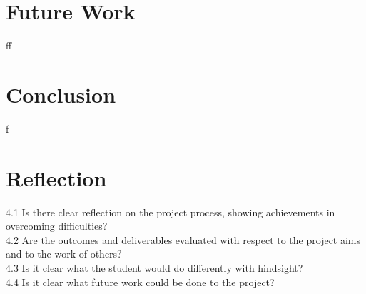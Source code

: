 \documentclass[12pt,a4paper]{article}
\begin{document}
\section{Future Work}
ff

\section{Conclusion}
f
\section{Reflection}
4.1 Is there clear reflection on the project process, showing achievements in overcoming difficulties?\\
4.2 Are the outcomes and deliverables evaluated with respect to the project aims and to the work of others?\\
4.3 Is it clear what the student would do differently with hindsight?\\
4.4 Is it clear what future work could be done to the project? \\




\end{document}
